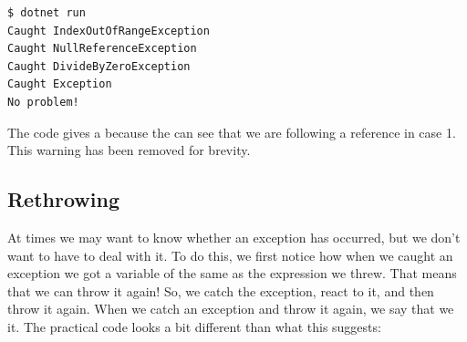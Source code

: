 \begin{verbatim}
$ dotnet run
Caught IndexOutOfRangeException
Caught NullReferenceException
Caught DivideByZeroException
Caught Exception
No problem!
\end{verbatim}

The code gives a  because the  can see that we are following a  reference in case 1. This warning has been removed for brevity.

\subsection{Rethrowing}

At times we may want to know whether an exception has occurred, but we don't want to have to deal with it. To do this, we first notice how when we caught an exception we got a variable of the same  as the expression we threw. That means that we can throw it again! So, we catch the exception, react to it, and then throw it again. When we catch an exception and throw it again, we say that we  it. The practical code looks a bit different than what this suggests:

\inputminted[firstline=1]{csharp}{../src/csharp/exceptions/rethrowing/Program.cs}

